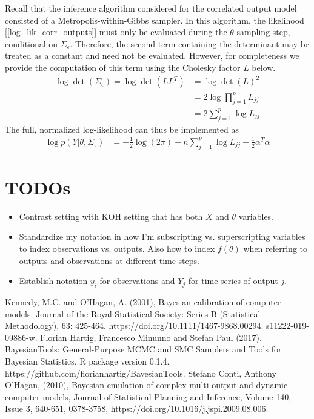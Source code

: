 \documentclass[12pt]{article}
\begin{document}
Recall that the inference algorithm considered for the correlated output model consisted of a Metropolis-within-Gibbs sampler. In this algorithm, the likelihood 
[\ref{log_lik_corr_outputs}] must only be evaluated during the $\theta$ sampling step, conditional on $\Sigma_\epsilon$. Therefore, the second term containing the 
determinant may be treated as a constant and need not be evaluated. However, for completeness we provide the computation of this term using the Cholesky 
factor $L$ below. 
\begin{align}
\log \det(\Sigma_\epsilon) = \log \det(LL^T) &= \log \det(L)^2 \\
								  &= 2 \log \prod_{j = 1}^{p} L_{jj} \\
								  &= 2 \sum_{j = 1}^{p} \log L_{jj}
\end{align}
The full, normalized log-likelihood can thus be implemented as
\begin{align}
\log p(Y|\theta, \Sigma_\epsilon) &= -\frac{1}{2} \log(2\pi) - n\sum_{j = 1}^{p} \log L_{jj}  - \frac{1}{2} \alpha^T \alpha
\end{align}

\section{TODOs}
\begin{itemize}
\item Contrast setting with KOH setting that has both $X$ and $\theta$ variables. 
\item Standardize my notation in how I'm subscripting vs. superscripting variables to index observations vs. outputs. Also how to 
index $f(\theta)$ when referring to outputs and observations at different time steps. 
\item Establish notation $y_i$ for observations and $Y_j$ for time series of output $j$. 
\end{itemize}

\begin{thebibliography}{20}
 Kennedy, M.C. and O'Hagan, A. (2001), Bayesian calibration of computer models. Journal of the Royal Statistical Society: Series B (Statistical Methodology), 63: 425-464. https://doi.org/10.1111/1467-9868.00294.
s11222-019-09886-w.
 Florian Hartig, Francesco Minunno and Stefan Paul (2017). BayesianTools: General-Purpose MCMC and SMC Samplers and Tools for Bayesian Statistics. R package version 0.1.4. https://github.com/florianhartig/BayesianTools.
 Stefano Conti, Anthony O’Hagan, (2010), Bayesian emulation of complex multi-output and dynamic computer models, Journal of Statistical Planning and Inference,
Volume 140, Issue 3, 640-651, 0378-3758, https://doi.org/10.1016/j.jspi.2009.08.006.
\end{thebibliography}
\end{document}
